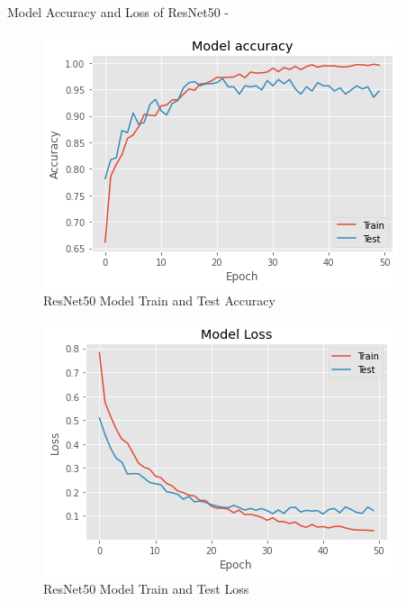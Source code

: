 \newpage
\vspace{5mm}
\noindent Model Accuracy and Loss of ResNet50 -
\vspace{5mm}
\begin{figure}[hbt!]
\centering
\includegraphics[scale=1]{images/fig-29.png}
\caption{ResNet50 Model Train and Test Accuracy}
\label{fig:x ResNet50 Model Train and Test Accuracy}
\end{figure}

\vspace{5mm}
\begin{figure}[hbt!]
\centering
\includegraphics[scale=1]{images/fig-30.png}
\caption{ResNet50 Model Train and Test Loss}
\label{fig:x ResNet50 Model Train and Test Loss}
\end{figure}

